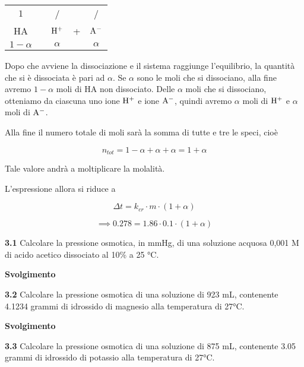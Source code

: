 \begin{center}
    \begin{tabular}{ccccc}
        $1$ & & / & & /\\
        HA & \ce{<-->} & $\rm H^+$ & + & $\rm A^-$\\
        $1 - \alpha$ &  &  $\alpha$ & & $\alpha$\\
    \end{tabular}
\end{center}

Dopo che avviene la dissociazione e il sistema raggiunge l'equilibrio, la quantità che si è dissociata è pari ad $\alpha$. Se $\alpha$ sono le moli che si dissociano, alla fine avremo $1-\alpha$ moli di HA non dissociato. Delle $\alpha$ moli che si dissociano, otteniamo da ciascuna uno ione $\rm H^+$ e ione $\rm A^-$, quindi avremo $\alpha$ moli di $\rm H^+$ e $\alpha$ moli di $\rm A^-$.

Alla fine il numero totale di moli sarà la somma di tutte e tre le speci, cioè

$$n_{tot}=1 - \alpha + \alpha + \alpha=1+\alpha$$

Tale valore andrà a moltiplicare la molalità.

L'espressione allora si riduce a

$$\Delta t=k_{cr} \cdot m \cdot (1 + \alpha)$$

$$\implies
0.278 = 1.86 \cdot 0.1 \cdot (1+\alpha)$$

\vspace{0.2cm}\textbf{3.1} Calcolare la pressione osmotica, in mmHg, di una soluzione acquosa 0,001 M di acido acetico dissociato al 10\% a 25 °C.

\vspace{0.2cm}\large\textbf{Svolgimento}\normalsize

\vspace{0.2cm}

\vspace{0.2cm}\textbf{3.2} Calcolare la pressione osmotica di una soluzione di 923 mL, contenente 4.1234 grammi di idrossido di magnesio alla temperatura di 27°C. 

\vspace{0.2cm}\large\textbf{Svolgimento}\normalsize

\vspace{0.2cm}

\vspace{0.2cm}\textbf{3.3} Calcolare la pressione osmotica di una soluzione di 875 mL, contenente 3.05 grammi di idrossido
di potassio alla temperatura di 27°C.

